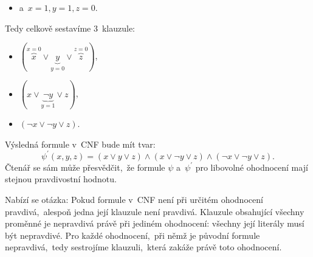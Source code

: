 \begin{example}
\begin{itemize}
        \item a~$x=1,y=1,z=0$.
    \end{itemize}
    Tedy celkově sestavíme 3~klauzule:
    \begin{itemize}
        \item \((\overbrace{x}^{x=0}\lor \underbrace{y}_{y=0}\lor \overbrace{z}^{z=0})\),
        \item \((x\lor\underbrace{\neg y}_{y=1}\lor z)\),
        \item \((\neg x\lor\neg y\lor z)\).
    \end{itemize}
    Výsledná formule v~CNF bude mít tvar:
    \[\psi^\prime(x,y,z)=(x\lor y\lor z)\land (x\lor \neg y\lor z)\land (\neg x\lor \neg y\lor z).\]
    Čtenář se sám může přesvědčit,~že formule $\psi$ a~$\psi^\prime$ pro libovolné ohodnocení mají stejnou pravdivostní hodnotu.
\end{example}
Nabízí se otázka: \emph{} Pokud formule v~CNF není při určitém ohodnocení pravdivá,~alespoň jedna její klauzule není pravdivá. Klauzule obsahující všechny proměnné je nepravdivá právě při jediném ohodnocení: všechny její literály musí být nepravdivé. Pro každé ohodnocení,~při němž je původní formule nepravdivá,~tedy sestrojíme klauzuli,~která zakáže právě toto ohodnocení.
